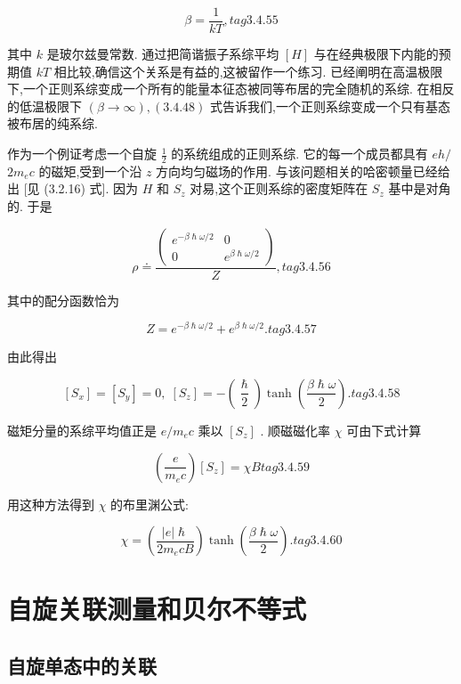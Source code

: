 $$
\beta = \frac{1}{kT}, tag{3. 4. 55}
$$

其中 $k$ 是玻尔兹曼常数. 通过把简谐振子系综平均 $\left\lbrack H\right\rbrack$ 与在经典极限下内能的预期值 ${kT}$ 相比较,确信这个关系是有益的,这被留作一个练习. 已经阐明在高温极限下,一个正则系综变成一个所有的能量本征态被同等布居的完全随机的系综. 在相反的低温极限下 $\left( {\beta \rightarrow \infty }\right) ,\left( {3.4.48}\right)$ 式告诉我们,一个正则系综变成一个只有基态被布居的纯系综.

作为一个例证考虑一个自旋 $\frac{1}{2}$ 的系统组成的正则系综. 它的每一个成员都具有 ${eh}/$ $2{m}_{e}c$ 的磁矩,受到一个沿 $z$ 方向均匀磁场的作用. 与该问题相关的哈密顿量已经给出 [见 (3.2.16) 式]. 因为 $H$ 和 ${S}_{z}$ 对易,这个正则系综的密度矩阵在 ${S}_{z}$ 基中是对角的. 于是

$$
\rho \doteq \frac{\left( \begin{matrix} {e}^{-\beta \hslash \omega /2} & 0 \\ 0 & {e}^{\beta \hslash \omega /2} \end{matrix}\right) }{Z}, tag{3. 4.56}
$$

其中的配分函数恰为

$$
Z = {e}^{-\beta \hslash \omega /2} + {e}^{\beta \hslash \omega /2}. tag{3. 4.57}
$$

由此得出

$$
\left\lbrack {S}_{x}\right\rbrack = \left\lbrack {S}_{y}\right\rbrack = 0,\;\left\lbrack {S}_{z}\right\rbrack = - \left( \frac{\hslash }{2}\right) \tanh \left( \frac{\beta \hslash \omega }{2}\right) . tag{3. 4.58}
$$

磁矩分量的系综平均值正是 $e/{m}_{e}c$ 乘以 $\left\lbrack {S}_{z}\right\rbrack$ . 顺磁磁化率 $\chi$ 可由下式计算

$$
\left( \frac{e}{{m}_{e}c}\right) \left\lbrack {S}_{z}\right\rbrack = {\chi B} tag{3. 4.59}
$$

用这种方法得到 $\chi$ 的布里渊公式:

$$
\chi = \left( \frac{\left| e\right| \hslash }{2{m}_{e}{cB}}\right) \tanh \left( \frac{\beta \hslash \omega }{2}\right) . tag{3. 4.60}
$$

\section{自旋关联测量和贝尔不等式}
\subsection{自旋单态中的关联}

